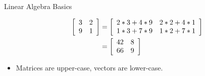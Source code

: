\documentclass[hyperref={pdfpagelabels=false}]{beamer}
\begin{document}
\begin{frame}{Linear Algebra Basics}
\begin{itemize}
\begin{align*}
\left[\begin{array}{c c}
3 & 2 \\ 9 & 1
\end{array}\right] &=
\left[\begin{array}{c c}
2*3 + 4*9 & 2*2 + 4*1 \\ 1*3 + 7*9 & 1*2 + 7*1
\end{array}\right] \\
&= \left[\begin{array}{c c}
42 & 8 \\ 66 & 9
\end{array}\right]
\end{align*}
\item Matrices are upper-case, vectors are lower-case.
\end{itemize}
\end{frame}


\end{document}
